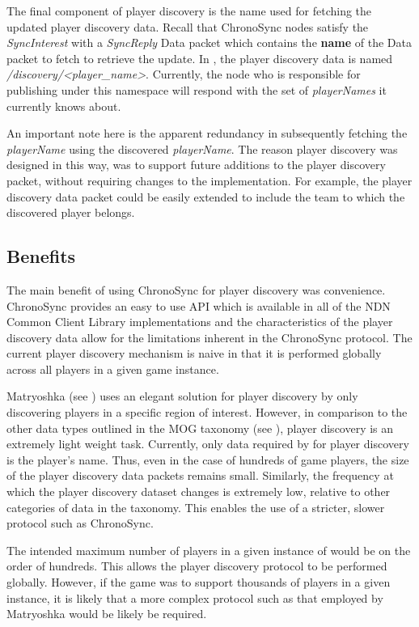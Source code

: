 \sloppy The final component of player discovery is the name used for fetching the updated player discovery data. Recall that ChronoSync nodes satisfy the \textit{SyncInterest} with a \textit{SyncReply} Data packet which contains the \textbf{name} of the Data packet to fetch to retrieve the update. In \game{}, the player discovery data is named \textit{\gameprefix{}/discovery/<player\_name>}. Currently, the node who is responsible for publishing under this namespace will respond with the set of \textit{playerNames} it currently knows about.

An important note here is the apparent redundancy in subsequently fetching the \textit{playerName} using the discovered \textit{playerName}. The reason player discovery was designed in this way, was to support future additions to the player discovery packet, without requiring changes to the implementation. For example, the player discovery data packet could be easily extended to include the team to which the discovered player belongs.

\subsection{Benefits}
The main benefit of using ChronoSync for player discovery was convenience. ChronoSync provides an easy to use API which is available in all of the NDN Common Client Library implementations and the characteristics of the player discovery data allow for the limitations inherent in the ChronoSync protocol. The current player discovery mechanism is naive in that it is performed globally across all players in a given game instance.

Matryoshka (see ) uses an elegant solution for player discovery by only discovering players in a specific region of interest. However, in comparison to the other data types outlined in the MOG taxonomy (see ), player discovery is an extremely light weight task. Currently, only data required by \game{} for player discovery is the player's name. Thus, even in the case of hundreds of game players, the size of the player discovery data packets remains small. Similarly, the frequency at which the player discovery dataset changes is extremely low, relative to other categories of data in the taxonomy. This enables the use of a stricter, slower protocol such as ChronoSync.

The intended maximum number of players in a given instance of \game{} would be on the order of hundreds. This allows the player discovery protocol to be performed globally. However, if the game was to support thousands of players in a given instance, it is likely that a more complex protocol such as that employed by Matryoshka would be likely be required.


